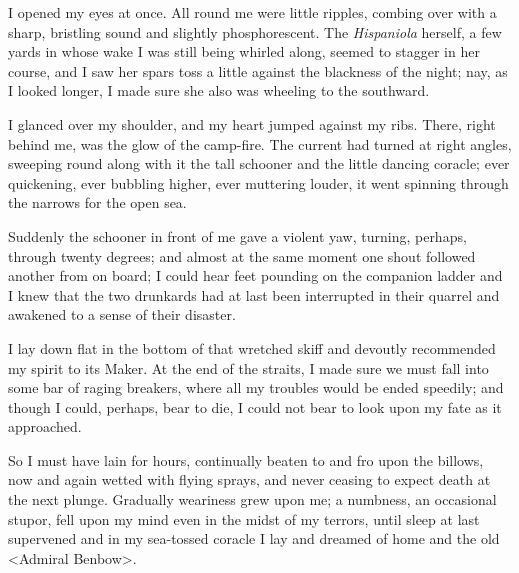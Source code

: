 I opened my eyes at once. All round me were little ripples, combing over with a sharp, bristling sound and slightly phosphorescent. The \textit{Hispaniola} herself, a few yards in whose wake I was still being whirled along, seemed to stagger in her course, and I saw her spars toss a little against the blackness of the night; nay, as I looked longer, I made sure she also was wheeling to the southward.

I glanced over my shoulder, and my heart jumped against my ribs. There, right behind me, was the glow of the camp-fire. The current had turned at right angles, sweeping round along with it the tall schooner and the little dancing coracle; ever quickening, ever bubbling higher, ever muttering louder, it went spinning through the narrows for the open sea.

Suddenly the schooner in front of me gave a violent yaw, turning, perhaps, through twenty degrees; and almost at the same moment one shout followed another from on board; I could hear feet pounding on the companion ladder and I knew that the two drunkards had at last been interrupted in their quarrel and awakened to a sense of their disaster.

I lay down flat in the bottom of that wretched skiff and devoutly recommended my spirit to its Maker. At the end of the straits, I made sure we must fall into some bar of raging breakers, where all my troubles would be ended speedily; and though I could, perhaps, bear to die, I could not bear to look upon my fate as it approached.

So I must have lain for hours, continually beaten to and fro upon the billows, now and again wetted with flying sprays, and never ceasing to expect death at the next plunge. Gradually weariness grew upon me; a numbness, an occasional stupor, fell upon my mind even in the midst of my terrors, until sleep at last supervened and in my sea-tossed coracle I lay and dreamed of home and the old <Admiral Benbow>.